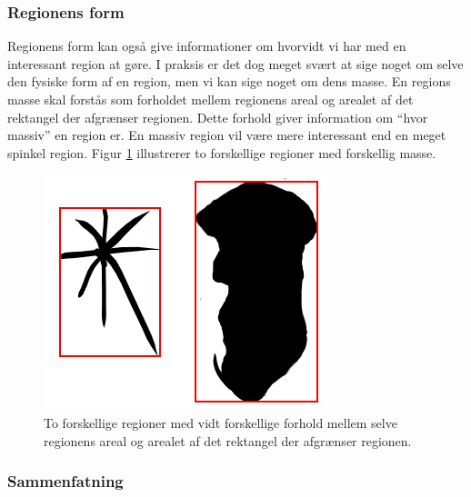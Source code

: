 {\subsubsection{Regionens form}
Regionens form kan også give informationer om hvorvidt vi har med en
interessant region at gøre. I praksis er det dog meget svært at sige
noget om selve den fysiske form af en region, men vi kan sige noget om
dens masse. En regions masse skal forstås som forholdet mellem regionens areal og
arealet af det rektangel der afgrænser regionen. Dette forhold giver
information om ``hvor massiv'' en region er. En massiv region vil være
mere interessant end en meget spinkel region. Figur \ref{region_mass}
illustrerer to forskellige regioner med forskellig masse.
\begin{figure}[h]
	\begin{center}
		\includegraphics[scale=\imgscale,angle=0]{afsnit/vores_implementation/billeder/naiv_algoritme/bbox_area_ratio}
	\end{center}
	\caption[Regioners masse]{To forskellige regioner med vidt forskellige forhold
	mellem selve regionens areal og arealet af det rektangel der
	afgrænser regionen.}
	\label{region_mass}
\end{figure}

\subsubsection{Sammenfatning}

}
